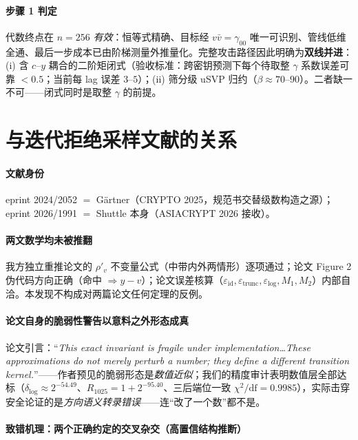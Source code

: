 \documentclass[11pt,a4paper]{ctexart}
\begin{document}
\paragraph{步骤 1 判定} 代数终点在 $n{=}256$ \emph{有效}：恒等式精确、目标经 $v\bar v{=}\gamma_{00}$ 唯一可识别、管线低维全通、最后一步成本已由阶梯测量外推量化。完整攻击路径因此明确为\textbf{双线并进}：(i) 含 $c$--$y$ 耦合的二阶矩闭式（验收标准：跨密钥预测下每个待取整 $\gamma$ 系数误差可靠 $<0.5$；当前每 lag 误差 $3$--$5$）；(ii) 筛分级 uSVP 归约（$\beta\approx70$--$90$）。二者缺一不可——闭式同时是取整 $\gamma$ 的前提。

\section{与迭代拒绝采样文献的关系}\label{sec:lit}

\paragraph{文献身份} eprint 2024/2052 $=$ G\"artner\cite{gaertner}（CRYPTO 2025，规范书交替级数构造之源）；eprint 2026/1991 $=$ Shuttle 本身\cite{shuttle}（ASIACRYPT 2026 接收）。

\paragraph{两文数学均未被推翻} 我方独立重推论文的 $\rho'_v$ 不变量公式（中带内外两情形）逐项通过；论文 Figure 2 伪代码方向正确（命中 $\Rightarrow y-v$）；论文误差核算（$\varepsilon_{\mathrm{id}},\varepsilon_{\mathrm{trunc}},\varepsilon_{\mathrm{log}},M_1,M_2$）内部自洽。本发现不构成对两篇论文任何定理的反例。

\paragraph{论文自身的脆弱性警告以意料之外形态成真} 论文引言：``\emph{This exact invariant is fragile under implementation\dots These approximations do not merely perturb a number; they define a different transition kernel.}''——作者预见的脆弱形态是\emph{数值近似}；我们的精度审计表明数值层全部达标（$\delta_{\log}\approx2^{-54.49}$、$R_{1025}=1+2^{-95.40}$、三后端位一致 $\chi^2/\mathrm{df}=0.9985$），实际击穿安全论证的是\emph{方向语义转录错误}——连``改了一个数''都不是。

\paragraph{致错机理：两个正确约定的交叉杂交（高置信结构推断）}
\end{document}
